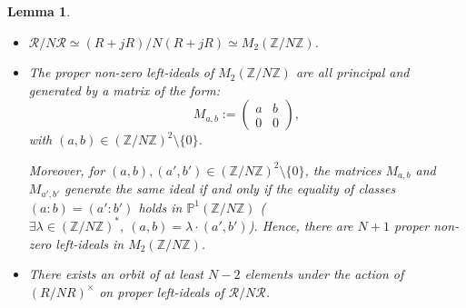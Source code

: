 \documentclass[a4paper,10pt,notitlepage]{report}
\theoremstyle{definition}
\theoremstyle{plain}
\newtheorem{Lemma}[Definition]{Lemma}
\theoremstyle{definition}
\newcommand{\Z}{\mathbb{Z}}
\newcommand{\m}[1]{\mathcal{#1}}
\renewcommand{\(}{\left(}
\renewcommand{\)}{\right)}
\renewcommand{\P}{\mathbb{P}}
\begin{document}
\begin{Lemma}\label{Lemma 4}
\begin{itemize}
\item[(i)] $\m{R}/N\m{R}\simeq (R+jR)/N(R+jR) \simeq M_2(\Z/N\Z)$.
\item[(ii)] The proper non-zero left-ideals of $M_2(\Z/N\Z)$ are all principal and generated by a matrix of the form:
\[M_{a,b}:=\(\begin{array}{cc}
a  & b\\ 0 & 0
\end{array}\),\]
with $(a,b)\in(\Z/N\Z)^2\setminus\{0\}$.  

Moreover, for $(a,b),(a',b')\in(\Z/N\Z)^2\setminus\{0\}$, the matrices $M_{a,b}$ and $M_{a',b'}$ generate the same ideal if and only if the equality of classes $(a:b)=(a':b')$ holds in $\P^1(\Z/N\Z)$ ($\exists \lambda\in(\Z/N\Z)^*, \ (a,b)=\lambda\cdot(a',b')$). Hence, there are $N+1$ proper non-zero left-ideals in $M_2(\Z/N\Z)$.

\item[(iii)] There exists an orbit of at least $N-2$ elements under the action of $(R/NR)^\times$ on proper left-ideals of $\m{R}/N\m{R}$.
\end{itemize}
\end{Lemma}
\end{document}
